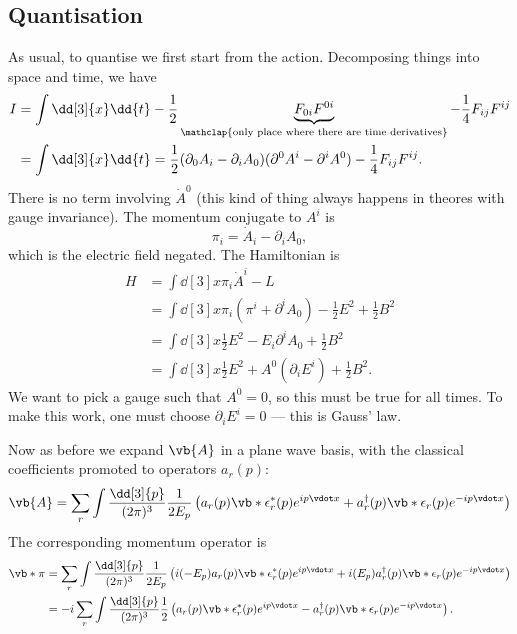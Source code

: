 \documentclass{jknotes} %
\begin{document}
\subsection{Quantisation}
As usual, to quantise we first start from the action. Decomposing things into space and time, we have
\begin{align}
    I &= \int\dd[3]{x}\dd{t}  -\frac{1}{2} \underbrace{F_{0i}F^{0i}}_{\mathclap{\text{only place where there are time derivatives}}} - \frac{1}{4}F_{ij}F^{ij} \\
      &= \int\dd[3]{x}\dd{t}  =\frac{1}{2}(\partial_0 A_i - \partial_i A_0)(\partial^0 A^i - \partial^i A^0) - \frac{1}{4}F_{ij}F^{ij}.
\end{align}
There is no term involving \(\dot{A}^0\) (this kind of thing always happens in theores with gauge invariance). The momentum conjugate to \(A^i\) is
\begin{equation}
    \pi_i = \dot{A}_i - \partial_iA_0,
\end{equation}
which is the electric field negated. The Hamiltonian is
\begin{align}
    H &= \int\dd[3]{x} \pi_i\dot{A}^i - L \\
      &= \int\dd[3]{x} \pi_i(\pi^i+\partial^iA_0) - \frac{1}{2}E^2+\frac{1}{2}B^2 \\
      &= \int\dd[3]{x} \frac{1}{2}E^2 - E_i\partial^i A_0 + \frac{1}{2}B^2 \\
      &= \int\dd[3]{x} \frac{1}{2}E^2 + A^0(\partial_iE^i) + \frac{1}{2}B^2.
\end{align}
We want to pick a gauge such that \(A^0=0\), so this must be true for all times. To make this work, one must choose \(\partial_iE^i=0\) --- this is Gauss' law.

Now as before we expand \(\vb{A}\) in a plane wave basis, with the classical coefficients promoted to operators \(a_r(p)\):
\begin{equation}
    \vb{A} = \sum_r\int\frac{\dd[3]{p}}{(2\pi)^3}\frac{1}{2E_p}\left(a_r(p)\vb*{\epsilon}^*_r(p)e^{ip\vdot x} + a_r^\dagger(p)\vb*{\epsilon}_r(p)e^{-ip\vdot x}\right)
\end{equation}
The corresponding momentum operator is
\begin{align}
    \vb*{\pi} &= \sum_r\int\frac{\dd[3]{p}}{(2\pi)^3}\frac{1}{2E_p}\left(i(-E_p)a_r(p)\vb*{\epsilon}^*_r(p)e^{ip\vdot x} + i(E_p)a_r^\dagger(p)\vb*{\epsilon}_r(p)e^{-ip\vdot x}\right) \\
              &= -i\sum_r\int\frac{\dd[3]{p}}{(2\pi)^3}\frac{1}{2}\left(a_r(p)\vb*{\epsilon}^*_r(p)e^{ip\vdot x} - a_r^\dagger(p)\vb*{\epsilon}_r(p)e^{-ip\vdot x}\right).
\end{align}
\end{document}
